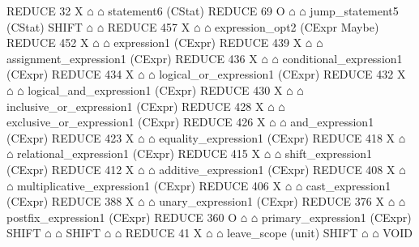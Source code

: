 \begin{isabellebody}
\begin{isamarkuptext}
\begin{isar}
        REDUCE 32 X $\house$ $\house$ statement6  (CStat) 
         REDUCE 69 O $\house$ $\house$ jump_statement5  (CStat) 
          SHIFT $\house$ $\house$ 
          REDUCE 457 X $\house$ $\house$ expression_opt2  (CExpr Maybe) 
           REDUCE 452 X $\house$ $\house$ expression1  (CExpr) 
            REDUCE 439 X $\house$ $\house$ assignment_expression1  (CExpr) 
             REDUCE 436 X $\house$ $\house$ conditional_expression1  (CExpr) 
              REDUCE 434 X $\house$ $\house$ logical_or_expression1  (CExpr) 
               REDUCE 432 X $\house$ $\house$ logical_and_expression1  (CExpr) 
                REDUCE 430 X $\house$ $\house$ inclusive_or_expression1  (CExpr) 
                 REDUCE 428 X $\house$ $\house$ exclusive_or_expression1  (CExpr) 
                  REDUCE 426 X $\house$ $\house$ and_expression1  (CExpr) 
                   REDUCE 423 X $\house$ $\house$ equality_expression1  (CExpr) 
                    REDUCE 418 X $\house$ $\house$ relational_expression1  (CExpr) 
                     REDUCE 415 X $\house$ $\house$ shift_expression1  (CExpr) 
                      REDUCE 412 X $\house$ $\house$ additive_expression1  (CExpr) 
                       REDUCE 408 X $\house$ $\house$ multiplicative_expression1  (CExpr) 
                        REDUCE 406 X $\house$ $\house$ cast_expression1  (CExpr) 
                         REDUCE 388 X $\house$ $\house$ unary_expression1  (CExpr) 
                          REDUCE 376 X $\house$ $\house$ postfix_expression1  (CExpr) 
                           REDUCE 360 O $\house$ $\house$ primary_expression1  (CExpr) 
                            SHIFT $\house$ $\house$ 
          SHIFT $\house$ $\house$ 
      REDUCE 41 X $\house$ $\house$ leave_scope  (unit) 
      SHIFT $\house$ $\house$ 
VOID  
\end{isar}%
\end{isamarkuptext}\isamarkuptrue%
%
\isadelimtheory
%
\endisadelimtheory
%
\isatagtheory
%
\endisatagtheory
{\isafoldtheory}%
%
\isadelimtheory
%
\endisadelimtheory
%
\end{isabellebody}%

